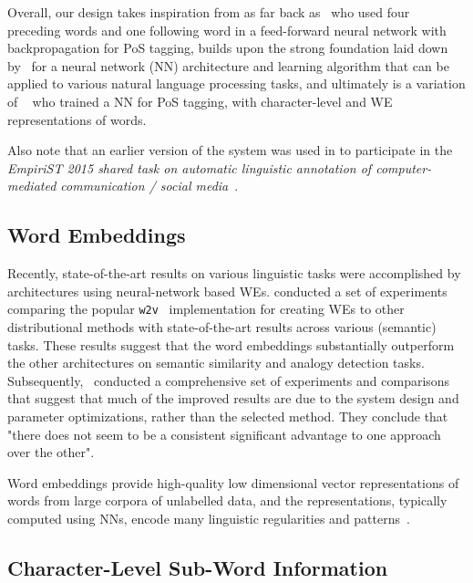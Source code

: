 \documentclass[11pt]{article}
\newcommand\wtv{\texttt{w2v}\xspace}
\begin{document}
Overall, our design takes inspiration from as far back as~
who used four preceding words and one following word in a feed-forward neural
network with backpropagation for PoS tagging, builds upon the strong foundation
laid down by~ for a neural network (NN) architecture
and learning algorithm that can be applied to various natural language
processing tasks, and
ultimately is a variation of
~ who trained a NN for PoS tagging, with 
character-level and WE representations of words. 

Also note that an earlier version of the system was used in
 to participate in the \emph{EmpiriST 2015 shared
task on automatic linguistic annotation of computer-mediated communication /
social media}~\cite{empirist:2016:WAC-X}.


\subsection{Word Embeddings} %

Recently, state-of-the-art results on various linguistic tasks were
accomplished by architectures using neural-network based WEs.
 conducted a set of
experiments comparing the popular
\wtv~\cite{DBLP:journals/corr/abs-1301-3781,arXiv:1310.4546}
implementation for creating WEs to other distributional methods with
state-of-the-art results across various (semantic) tasks. 
These results suggest that the word embeddings substantially
outperform the other architectures on semantic similarity and analogy
detection tasks.
Subsequently,~ conducted a comprehensive set of
experiments and comparisons that suggest that much of the improved results are
due to the system design and parameter optimizations, rather than the selected
method.  
They conclude that "there does not seem to be a consistent significant
advantage to one approach over the other".

Word embeddings provide high-quality low dimensional vector representations of
words from large corpora of unlabelled data, and the representations, typically
computed using NNs, encode many linguistic regularities and
patterns~\cite{arXiv:1310.4546}.


\subsection{Character-Level Sub-Word Information} %
\end{document}
